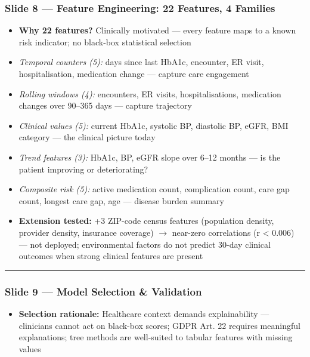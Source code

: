 \documentclass[11pt,a4paper]{article}
\begin{document}
\subsubsection{Slide 8 --- Feature Engineering: 22 Features, 4 Families}
\begin{itemize}
\item \textbf{Why 22 features?} Clinically motivated --- every feature maps to a known risk indicator; no black-box statistical selection
\item \emph{Temporal counters (5):} days since last HbA1c, encounter, ER visit, hospitalisation, medication change --- capture care engagement
\item \emph{Rolling windows (4):} encounters, ER visits, hospitalisations, medication changes over 90--365 days --- capture trajectory
\item \emph{Clinical values (5):} current HbA1c, systolic BP, diastolic BP, eGFR, BMI category --- the clinical picture today
\item \emph{Trend features (3):} HbA1c, BP, eGFR slope over 6--12 months --- is the patient improving or deteriorating?
\item \emph{Composite risk (5):} active medication count, complication count, care gap count, longest care gap, age --- disease burden summary
\item \textbf{Extension tested:} +3 ZIP-code census features (population density, provider density, insurance coverage) $\rightarrow$ near-zero correlations (r < 0.006) --- not deployed; environmental factors do not predict 30-day clinical outcomes when strong clinical features are present
\end{itemize}

\noindent\rule{\linewidth}{0.4pt}

\subsubsection{Slide 9 --- Model Selection \& Validation}
\begin{itemize}
\item \textbf{Selection rationale:} Healthcare context demands explainability --- clinicians cannot act on black-box scores; GDPR Art. 22 requires meaningful explanations; tree methods are well-suited to tabular features with missing values
\end{itemize}
\end{document}

